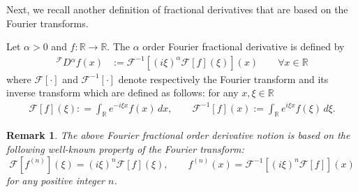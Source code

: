\documentclass[leqno,final]{siamltex}
\numberwithin{equation}{section}
\newtheorem{remark}{Remark}[section]
\renewcommand{\(}{\bigl(}
\renewcommand{\)}{\bigr)}
\newcommand{\R}{\mathbb{R}}
\begin{document}
            
            Next, we recall another definition of fractional derivatives that are based on the Fourier transforms.  

            \begin{definition} \label{def2.7}
	            Let $\alpha > 0$ and $f: \R \rightarrow \R$. The $\alpha$ order Fourier fractional derivative is defined by
	            \begin{align*}
	                {^{\mathcal{F}}}{{D}}{^{\alpha}}f(x) &:= \mathcal{F}^{-1} \left[ (i \xi)^{\alpha} \mathcal{F} [f](\xi)\right](x) \qquad \forall x \in \R
	            \end{align*}
                where $\mathcal{F}[\cdot]$ and $\mathcal{F}^{-1}[\cdot]$ denote respectively the Fourier transform and its inverse transform which are defined as follows: for any $x,\xi\in \R$
                \begin{align*}
                    \mathcal{F}[f](\xi) : = \int_{\R} e^{-i \xi x}f(x)\,dx,  \qquad \mathcal{F}^{-1}[f](x) := \int_{\R} e^{i\xi x}f(\xi)\,d\xi .
                \end{align*}
            \end{definition}

            \begin{remark}
	            The above Fourier fractional order derivative notion is based on the following well-known property of the Fourier transform:
                \[
                    \mathcal{F}[f^{(n)}](\xi)= (i \xi)^n \mathcal{F}[f](\xi), \qquad f^{(n)}(x)= \mathcal{F}^{-1}[ (i \xi)^n \mathcal{F}[f] ] (x)
                \]
                for any positive integer $n$.
            \end{remark}
   
    
\end{document}
